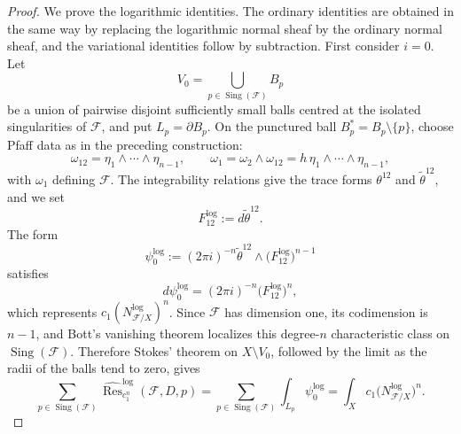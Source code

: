 \documentclass[10pt,a4paper]{amsart}
\DeclareMathOperator{\Sing}{Sing}
\newcommand{\cF}{\mathcal{F}}
\begin{document}
\begin{proof}
We prove the logarithmic identities. The ordinary identities are obtained in
the same way by replacing the logarithmic normal sheaf by the ordinary normal
sheaf, and the variational identities follow by subtraction.
First consider \(i=0\). Let
\[
V_0=\bigcup_{p\in \Sing(\cF)}B_p
\]
be a union of pairwise disjoint sufficiently small balls centred at the isolated
singularities of \(\cF\), and put \(L_p=\partial B_p\). On the punctured ball
\(B_p^\ast=B_p\setminus\{p\}\), choose Pfaff data as in the preceding
construction:
\[
\omega_{12}=\eta_1\wedge\cdots\wedge\eta_{n-1},
\qquad
\omega_1=\omega_2\wedge\omega_{12}
=
h\,\eta_1\wedge\cdots\wedge\eta_{n-1},
\]
with \(\omega_1\) defining \(\cF\). The integrability relations give the trace
forms \(\theta^{12}\) and \(\widetilde\theta^{12}\), and we set
\[
F_{12}^{\log}:=d\widetilde\theta^{12}.
\]
The form
\[
\psi_0^{\log}
:=
(2\pi i)^{-n}
\widetilde\theta^{12}\wedge
\bigl(F_{12}^{\log}\bigr)^{n-1}
\]
satisfies
\[
d\psi_0^{\log}
=
(2\pi i)^{-n}
\bigl(F_{12}^{\log}\bigr)^n,
\]
which represents \(c_1(N^{\log}_{\cF/X})^n\). Since \(\cF\) has dimension one,
its codimension is \(n-1\), and Bott's vanishing theorem localizes this
degree-\(n\) characteristic class on \(\Sing(\cF)\). Therefore Stokes' theorem
on \(X\setminus V_0\), followed by the limit as the radii of the balls tend to
zero, gives
\[
\sum_{p\in \Sing(\cF)}
\widehat{\operatorname{Res}}^{\log}_{c_1^n}(\cF,D,p)
=
\sum_{p\in \Sing(\cF)}
\int_{L_p}\psi_0^{\log}
=
\int_X c_1\bigl(N^{\log}_{\cF/X}\bigr)^n.
\]


\end{proof}
\end{document}
